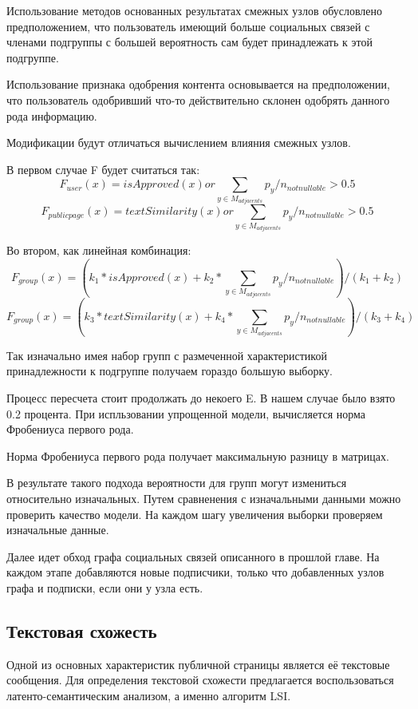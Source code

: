 \documentclass[annotation,times,page4]{itmo-student-thesis}
\begin{document}
Использование методов основанных результатах смежных узлов обусловлено предположением, что пользователь имеющий больше социальных связей с членами подгруппы с большей вероятность сам будет принадлежать к этой подгруппе.

Использование признака одобрения контента основывается на предположении, что пользователь одобривший что-то действительно склонен одобрять данного рода информацию.


Модификации будут отличаться вычислением влияния смежных узлов.

В первом случае F будет считаться так:
\[
    F_{user}(x) = isApproved(x) or \sum_{y \in M_{adjacents}}p_{y}/n_{notnullable} > 0.5 
\]
\[
    F_{publicpage}(x) = textSimilarity(x) or \sum_{y \in M_{adjacents}}p_{y}/n_{notnullable} > 0.5 
\]

Во втором, как линейная комбинация:
\[
    F_{group}(x) = (k_{1} * isApproved(x) + k_{2} * \sum_{y \in M_{adjacents}}p_{y}/n_{notnullable}) / (k_{1} + k_{2}) 
\] 
\[
    F_{group}(x) = (k_{3} * textSimilarity(x) + k_{4} * \sum_{y \in M_{adjacents}}p_{y}/n_{notnullable}) / (k_{3} + k_{4}) 
\] 


Так изначально имея набор групп с размеченной характеристикой принадлежности к подгруппе получаем гораздо большую выборку. 

Процесс пересчета стоит продолжать до некоего E. В нашем случае было взято 0.2 процента.
При испльзовании упрощенной модели, вычисляется норма Фробениуса первого рода. 
  
Норма Фробениуса первого рода получает максимальную разницу в матрицах.

В результате такого подхода вероятности для групп могут измениться относительно изначальных. Путем сравненения с изначальными данными можно проверить качество модели.
На каждом шагу увеличения выборки проверяем изначальные данные.


Далее идет обход графа социальных связей описанного в прошлой главе. На каждом этапе добавляются новые подписчики, только что добавленных узлов графа и подписки, если они у узла есть.

\subsection{Текстовая схожесть}
Одной из основных характеристик публичной страницы является её текстовые сообщения. 
Для определения текстовой схожести предлагается воспользоваться латенто-семантическим анализом, а именно алгоритм LSI.  
\end{document}
